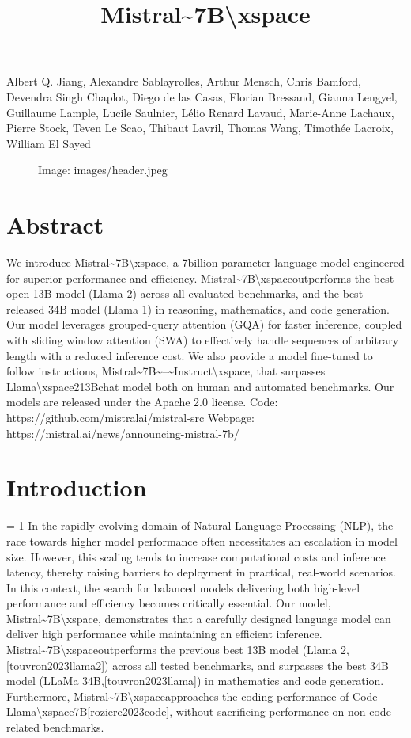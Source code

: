 \documentclass[11pt,a4paper]{article}
\begin{document}
\title{Mistral\textasciitilde{}7B\textbackslash{}xspace}

Albert Q. Jiang, Alexandre Sablayrolles, Arthur Mensch, Chris Bamford, Devendra Singh Chaplot, Diego de las Casas, Florian Bressand, Gianna Lengyel, Guillaume Lample, Lucile Saulnier, Lélio Renard Lavaud, Marie-Anne Lachaux, Pierre Stock, Teven Le Scao, Thibaut Lavril, Thomas Wang, Timothée Lacroix, William El Sayed

\begin{figure}[h]
\caption{Image: images/header.jpeg}
\end{figure}

\section{Abstract}

We introduce Mistral\textasciitilde{}7B\textbackslash{}xspace, a 7billion-parameter language model engineered for superior performance and efficiency. Mistral\textasciitilde{}7B\textbackslash{}xspaceoutperforms the best open 13B model (Llama 2) across all evaluated benchmarks, and the best released 34B model (Llama 1) in reasoning, mathematics, and code generation. Our model leverages grouped-query attention (GQA) for faster inference, coupled with sliding window attention (SWA) to effectively handle sequences of arbitrary length with a reduced inference cost. We also provide a model fine-tuned to follow instructions, Mistral\textasciitilde{}7B\textasciitilde{}--\textasciitilde{}Instruct\textbackslash{}xspace, that surpasses Llama\textbackslash{}xspace213Bchat model both on human and automated benchmarks. Our models are released under the Apache 2.0 license. Code: https://github.com/mistralai/mistral-src Webpage: https://mistral.ai/news/announcing-mistral-7b/

\section{Introduction}

=-1 In the rapidly evolving domain of Natural Language Processing (NLP), the race towards higher model performance often necessitates an escalation in model size. However, this scaling tends to increase computational costs and inference latency, thereby raising barriers to deployment in practical, real-world scenarios. In this context, the search for balanced models delivering both high-level performance and efficiency becomes critically essential. Our model, Mistral\textasciitilde{}7B\textbackslash{}xspace, demonstrates that a carefully designed language model can deliver high performance while maintaining an efficient inference. Mistral\textasciitilde{}7B\textbackslash{}xspaceoutperforms the previous best 13B model (Llama 2, [touvron2023llama2]) across all tested benchmarks, and surpasses the best 34B model (LLaMa 34B,[touvron2023llama]) in mathematics and code generation. Furthermore, Mistral\textasciitilde{}7B\textbackslash{}xspaceapproaches the coding performance of Code-Llama\textbackslash{}xspace7B[roziere2023code], without sacrificing performance on non-code related benchmarks.
\end{document}

